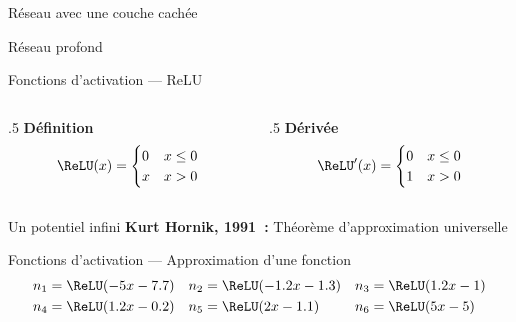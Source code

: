 \begin{frame}{Réseau avec une couche cachée}
  \centering
\end{frame}

\begin{frame}{Réseau profond}
  \centering
\end{frame}

\begin{frame}{Fonctions d'activation --- ReLU}
    \begin{center}
    \end{center}
  
    \begin{columns}
      \begin{column}{.5\tw}
        \centering
        \textbf{Définition}
        \[
          \ReLU(x) = \begin{cases}
                       0 & x \leq 0 \\
                       x & x > 0 \\
                     \end{cases}
        \]
        \end{column}
      \begin{column}{{.5\tw}}
        \centering
        \textbf{Dérivée}
        \[
          \ReLU'(x) =  \begin{cases}
                         0 & x \leq 0 \\
                         1 & x > 0\\
                       \end{cases}
        \]
      \end{column}
    \end{columns}
\end{frame}
  
\begin{frame}{Un potentiel infini}
  \textbf{Kurt Hornik, 1991~:} Théorème d'approximation universelle

\end{frame}

\begin{frame}{Fonctions d'activation --- Approximation d'une fonction}
  \centering
  {\small
    \begin{align*}
      n_1 & = \ReLU(-5x - 7.7) & n_2 & = \ReLU(-1.2x - 1.3) & n_3 & = \ReLU(1.2x - 1) \\
      n_4 & = \ReLU(1.2x - 0.2) & n_5 & = \ReLU(2x - 1.1) & n_6 & = \ReLU(5x - 5) \\
    \end{align*}
  }
\end{frame}
